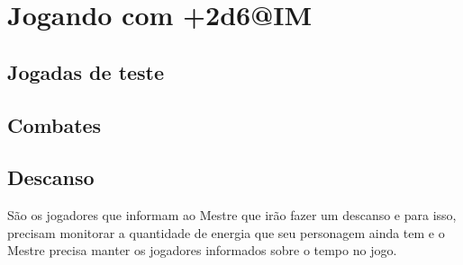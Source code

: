 \chapter{\label{ch:jogando}Jogando com +2d6@IM}


\section{\label{sec:testes}Jogadas de teste}

\section{\label{sec:combate}Combates}

\section{\label{sec:descanso}Descanso}
São os jogadores que informam ao Mestre que irão fazer um descanso e para isso, precisam monitorar a quantidade de energia que seu personagem ainda tem e o Mestre precisa manter os jogadores informados sobre o tempo no jogo.